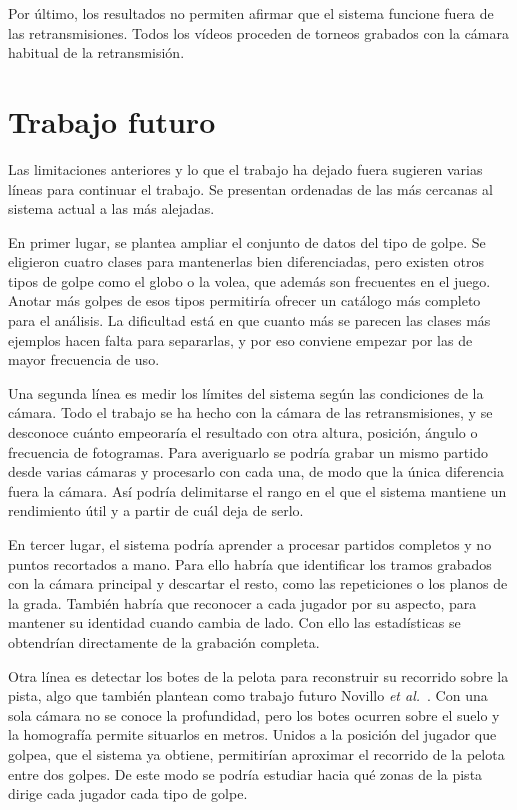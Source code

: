 Por último, los resultados no permiten afirmar que el sistema funcione fuera de las retransmisiones.
Todos los vídeos proceden de torneos grabados con la cámara habitual de la retransmisión.

\section{Trabajo futuro}
\label{sec:trabajo-futuro}

Las limitaciones anteriores y lo que el trabajo ha dejado fuera sugieren varias líneas para continuar el trabajo.
Se presentan ordenadas de las más cercanas al sistema actual a las más alejadas.

En primer lugar, se plantea ampliar el conjunto de datos del tipo de golpe.
Se eligieron cuatro clases para mantenerlas bien diferenciadas, pero existen otros tipos de golpe como el globo o la volea, que además son frecuentes en el juego.
Anotar más golpes de esos tipos permitiría ofrecer un catálogo más completo para el análisis.
La dificultad está en que cuanto más se parecen las clases más ejemplos hacen falta para separarlas, y por eso conviene empezar por las de mayor frecuencia de uso.

Una segunda línea es medir los límites del sistema según las condiciones de la cámara.
Todo el trabajo se ha hecho con la cámara de las retransmisiones, y se desconoce cuánto empeoraría el resultado con otra altura, posición, ángulo o frecuencia de fotogramas.
Para averiguarlo se podría grabar un mismo partido desde varias cámaras y procesarlo con cada una, de modo que la única diferencia fuera la cámara.
Así podría delimitarse el rango en el que el sistema mantiene un rendimiento útil y a partir de cuál deja de serlo.

En tercer lugar, el sistema podría aprender a procesar partidos completos y no puntos recortados a mano.
Para ello habría que identificar los tramos grabados con la cámara principal y descartar el resto, como las repeticiones o los planos de la grada.
También habría que reconocer a cada jugador por su aspecto, para mantener su identidad cuando cambia de lado.
Con ello las estadísticas se obtendrían directamente de la grabación completa.

Otra línea es detectar los botes de la pelota para reconstruir su recorrido sobre la pista, algo que también plantean como trabajo futuro Novillo \textit{et al.}~\cite{novillo2025padel}.
Con una sola cámara no se conoce la profundidad, pero los botes ocurren sobre el suelo y la homografía permite situarlos en metros.
Unidos a la posición del jugador que golpea, que el sistema ya obtiene, permitirían aproximar el recorrido de la pelota entre dos golpes.
De este modo se podría estudiar hacia qué zonas de la pista dirige cada jugador cada tipo de golpe.

